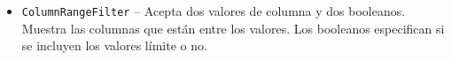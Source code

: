 \documentclass[14pt]{beamer}
\begin{document}
\begin{frame}
\begin{itemize}


\item {\tt ColumnRangeFilter} -- Acepta dos valores de columna y dos
  booleanos. Muestra las columnas que están entre los valores. Los
  booleanos especifican si se incluyen los valores límite o no.


\end{itemize}
\end{frame}
\end{document}
